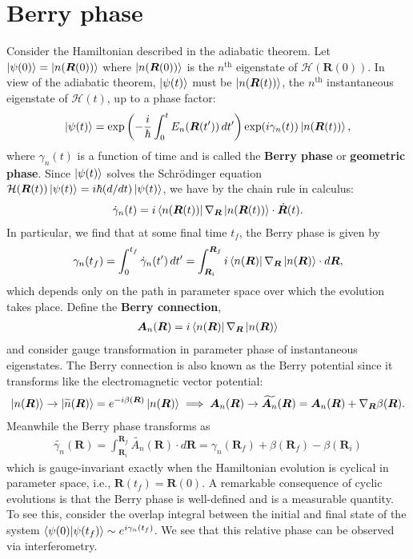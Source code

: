 \documentclass{article}
\theoremstyle{definition}
\newcommand{\f}[2]{\frac{#1}{#2}}
\newcommand{\lp}{\left(}
\newcommand{\rp}{\right)}
\begin{document}
\section{Berry phase}
Consider the Hamiltonian described in the adiabatic theorem.  Let $\ket{\psi(0)} = \ket{n(\bm{R}(0))}$ where $\ket{n(\bm{R}(0))}$ is the $n^\text{th}$ eigenstate of $\mathcal{H}(\bm{R}(0))$. In view of the adiabatic theorem, $\ket{\psi(t)}$ must be $\ket{n(\bm{R}(t))}$, the $n^\text{th}$ instantaneous eigenstate of $\mathcal{H}(t)$, up to a phase factor:
\begin{align*}
\ket{\psi(t)} = \exp\lp -\f{i}{\hbar }\int_0^t E_n(\bm{R} (t'))\,dt'   \rp \exp(i\gamma_n(t)) \ket{n(\bm{R}(t))},
\end{align*}
where $\gamma_n(t)$ is a function of time and is called the \textbf{Berry phase} or \textbf{geometric phase}. Since $\ket{\psi(t)}$ solves the Schr\"{o}dinger equation $\mathcal{H}(\bm{R}(t)) \ket{\psi(t)} = i\hbar (d/dt) \ket{{\psi}(t)}$, we have by the chain rule in calculus:
\begin{align*}
\dot{\gamma}_n(t) = i \bra{n(\bm{R}(t))} \nabla_{\bm{R}}  \ket{n(\bm{R}(t)) } \cdot \dot{\bm{R}}(t).
\end{align*}
In particular, we find that at some final time $t_f$, the Berry phase is given by 
\begin{align*}
\gamma_n(t_f) = \int_{0}^{t_f} \dot{\gamma}_n(t')\,dt' =   \int^{\bm{R}_f}_{\bm{R}_i} i \bra{n(\bm{R})} \nabla_{\bm{R}}  \ket{n(\bm{R}) } \cdot d{\bm{R}},
\end{align*} 
which depends only on the path in parameter space over which the evolution takes place. Define the \textbf{Berry connection}, 
\begin{align*}
\bm{A}_n(\bm{R}) = i \bra{n(\bm{R})} \nabla_{\bm{R}}  \ket{n(\bm{R}) }
\end{align*} 
and consider gauge transformation in parameter phase of instantaneous eigenstates. The Berry connection is also known as the Berry potential since it transforms like the electromagnetic  vector potential:
\begin{align*}
\ket{n(\bm{R})} \to \ket{\widetilde{n}(\bm{R})} = e^{-i\beta(\bm{R})}\ket{n(\bm{R})}  \implies \bm{A}_n(\bm{R}) \to  \widetilde{\bm{A}_n}(\bm{R}) = \bm{A}_n(\bm{R}) + \nabla_{\bm{R}} \beta (\bm{R}). 
\end{align*}
Meanwhile the Berry phase transforms as
\begin{align*}
\widetilde{\gamma_n} (\bm{R}) = \int_{\bm{R}_i}^{\bm{R}_f} \widetilde{A_n}(\bm{R})\cdot d\bm{R} = \gamma_n(\bm{R}_f)  + \beta(\bm{R}_f) - \beta({\bm{R}_i})
\end{align*}
which is gauge-invariant exactly when the Hamiltonian evolution is cyclical in parameter space, i.e., $\bm{R}(t_f) = \bm{R}(0)$. A remarkable consequence of cyclic evolutions is that the Berry phase is well-defined and is a measurable quantity. To see this, consider the overlap integral between the initial and final state of the system $\bra{\psi(0)}\ket{\psi(t_f)} \sim e^{i\gamma_n(t_f)}$. We see that this relative phase can be observed via interferometry. 
\end{document}

